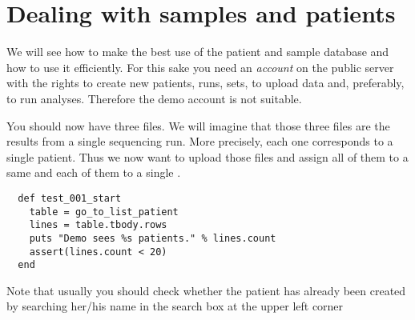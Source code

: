 \section{Dealing with samples and patients}
We will see how to make the best use of the patient and sample database and
how to use it efficiently.
For this sake you need an \textit{account} on the public server with the rights to create new patients,
runs, sets, to upload data and, preferably, to run analyses.
Therefore the demo account is not suitable.




You should now have three files. We will imagine that those three files are
the results from a single sequencing run. More precisely, each one corresponds to
a single patient. Thus we now want to upload those files and assign all of
them to a same  and each of them to a single .

\begin{verbatim}
  def test_001_start
    table = go_to_list_patient
    lines = table.tbody.rows
    puts "Demo sees %s patients." % lines.count
    assert(lines.count < 20)
  end

\end{verbatim}

Note that usually you should check whether the patient has
already been created by searching her/his name in the search box at the
upper left corner

